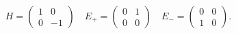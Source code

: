 \begin{equation}
H=\left(
\begin{array}{cc}
1 & 0 \\
0 & -1
\end{array}
\right) \quad E_{+}=\left(
\begin{array}{cc}
0 & 1 \\
0 & 0
\end{array}
\right) \quad E_{-}=\left(
\begin{array}{cc}
0 & 0 \\
1 & 0
\end{array}
\right) .
\end{equation}

